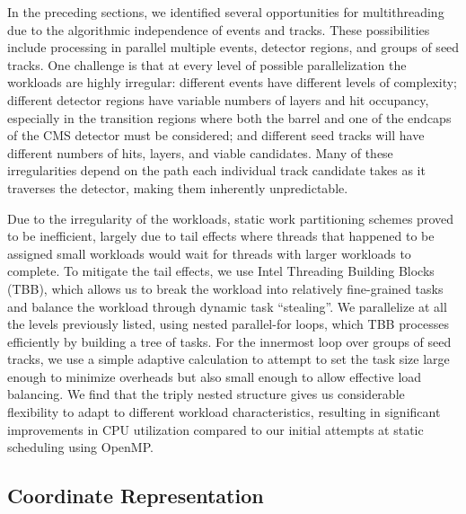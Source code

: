 \documentclass[a4paper,11pt]{article}
\newcommand{\Intel}{Intel\textregistered\xspace}
\begin{document}
In the preceding sections, we identified several opportunities for multithreading due to the algorithmic independence of events and tracks.  These possibilities include processing in parallel multiple events, detector regions, and groups of seed tracks.  One challenge is that at every level of possible parallelization the workloads are highly irregular: different events have different levels of complexity; different detector regions have variable numbers of layers and hit occupancy, especially in the transition regions where both the barrel and one of the endcaps of the CMS detector must be considered; and different seed tracks will have different numbers of hits, layers, and viable candidates.  Many of these irregularities depend on the path each individual track candidate takes as it traverses the detector, making them inherently unpredictable.

Due to the irregularity of the workloads, static work partitioning schemes proved to be inefficient, largely due to tail effects where threads that happened to be assigned small workloads would wait for threads with larger workloads to complete.  To mitigate the tail effects, we use \Intel Threading Building Blocks (TBB), which allows us to break the workload into relatively fine-grained tasks and balance the workload through dynamic task ``stealing''.  We parallelize at all the levels previously listed, using nested parallel-for loops, which TBB processes efficiently by building a tree of tasks.  For the innermost loop over groups of seed tracks, we use a simple adaptive calculation to attempt to set the task size large enough to minimize overheads but also small enough to allow effective load balancing.  We find that the triply nested structure gives us considerable flexibility to adapt to different workload characteristics, resulting in significant improvements in CPU utilization compared to our initial attempts at static scheduling using OpenMP.

\subsection{Coordinate Representation}
\end{document}
